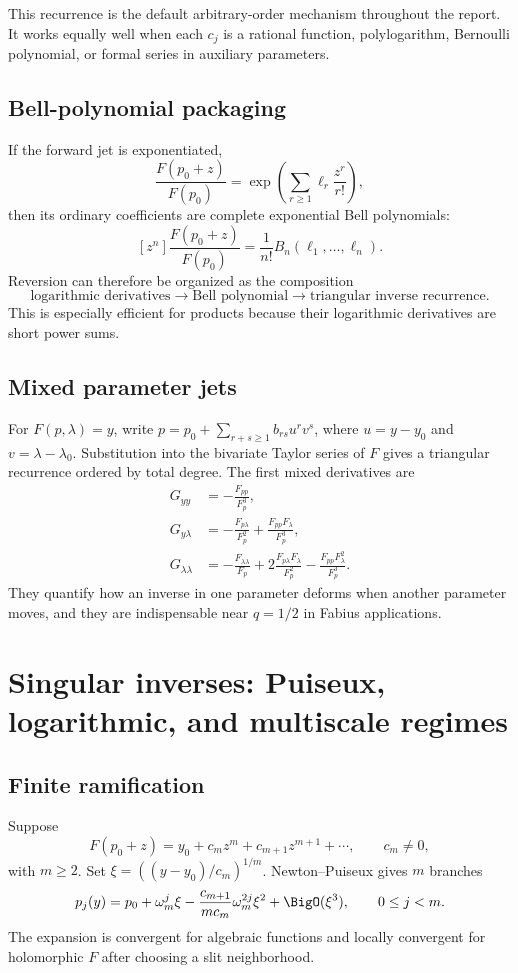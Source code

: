 \documentclass[11pt,letterpaper,oneside,openany]{book}
\theoremstyle{definition}
\theoremstyle{remark}
\begin{document}
This recurrence is the default arbitrary-order mechanism throughout the
report.  It works equally well when each \(c_j\) is a rational function,
polylogarithm, Bernoulli polynomial, or formal series in auxiliary parameters.

\section{Bell-polynomial packaging}
If the forward jet is exponentiated,
\[
 \frac{F(p_0+z)}{F(p_0)}
 =\exp\left(\sum_{r\ge1}\ell_r\frac{z^r}{r!}\right),
\]
then its ordinary coefficients are complete exponential Bell polynomials:
\[
 [z^n]\frac{F(p_0+z)}{F(p_0)}
 =\frac1{n!}B_n(\ell_1,\ldots,\ell_n).
\]
Reversion can therefore be organized as the composition
\[
 \text{logarithmic derivatives}
 \longrightarrow \text{Bell polynomial}
 \longrightarrow \text{triangular inverse recurrence}.
\]
This is especially efficient for products because their logarithmic
derivatives are short power sums.

\section{Mixed parameter jets}
For \(F(p,\lambda)=y\), write
\(p=p_0+\sum_{r+s\ge1}b_{rs}u^rv^s\), where
\(u=y-y_0\) and \(v=\lambda-\lambda_0\).  Substitution into the bivariate Taylor
series of \(F\) gives a triangular recurrence ordered by total degree.  The
first mixed derivatives are
\begin{align}
 G_{yy}&=-\frac{F_{pp}}{F_p^3}, \\
 G_{y\lambda}&=
 -\frac{F_{p\lambda}}{F_p^2}
 +\frac{F_{pp}F_{\lambda}}{F_p^3}, \\
 G_{\lambda\lambda}&=-\frac{F_{\lambda\lambda}}{F_p}
 +2\frac{F_{p\lambda}F_{\lambda}}{F_p^2}
 -\frac{F_{pp}F_{\lambda}^2}{F_p^3}.
\end{align}
They quantify how an inverse in one parameter deforms when another parameter
moves, and they are indispensable near \(q=1/2\) in Fabius applications.

\chapter{Singular inverses: Puiseux, logarithmic, and multiscale regimes}

\section{Finite ramification}
Suppose
\[
 F(p_0+z)=y_0+c_mz^m+c_{m+1}z^{m+1}+\cdots,
 \qquad c_m\ne0,
\]
with \(m\ge2\).  Set
\(\xi=((y-y_0)/c_m)^{1/m}\).  Newton--Puiseux gives \(m\) branches
\begin{equation}
 p_j(y)=p_0+\omega_m^j\xi
 -\frac{c_{m+1}}{mc_m}\omega_m^{2j}\xi^2
 +\BigO(\xi^3),
 \qquad 0\le j<m.
 \label{eq:generic-puiseux}
\end{equation}
The expansion is convergent for algebraic functions and locally convergent for
holomorphic \(F\) after choosing a slit neighborhood.
\end{document}
